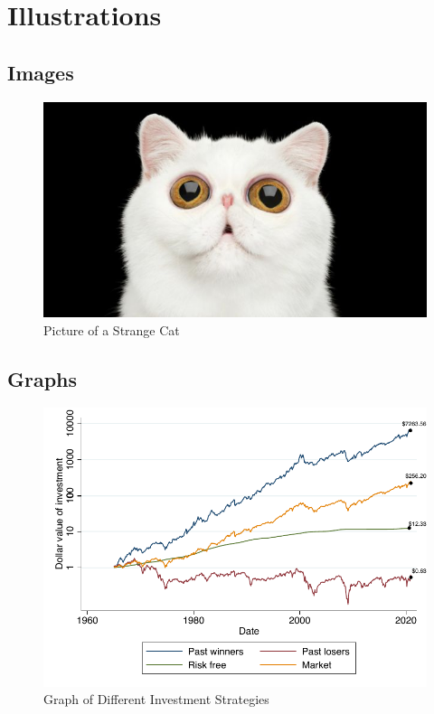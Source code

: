 \documentclass[a4paper, 12pt]{article}
\begin{document}
\newpage
\section{Illustrations}

\subsection{Images}

\begin{figure}[h]
    \centering
    \includegraphics[scale=0.8]{cat_picture.jpeg}
    \caption{Picture of a Strange Cat}
    \label{fig:cat}
\end{figure}

\subsection{Graphs}

\begin{figure}[h]
    \centering
    \includegraphics[scale=0.9]{Graph2.pdf}
    \caption{Graph of Different Investment Strategies}
    \label{fig:graph}
\end{figure}
\end{document}
